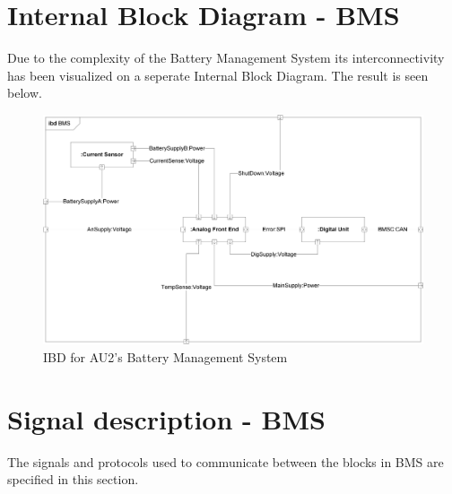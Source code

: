 \section{Internal Block Diagram - BMS}
Due to the complexity of the Battery Management System its interconnectivity has been visualized on a seperate Internal Block Diagram. The result is seen below.

\begin{figure}[H]
	\centering
	\includegraphics[width=1\linewidth]{Architecture/Diagrams/IBD_BMS}
	\caption{IBD for AU2's Battery Management System}
	\label{fig:IBD_BMS}
\end{figure}

\section{Signal description - BMS}
The signals and protocols used to communicate between the blocks in BMS are specified in this section.

